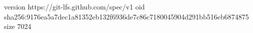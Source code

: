 version https://git-lfs.github.com/spec/v1
oid sha256:9176ea5a7dec1a81352eb132f6936de7c86c7180045904d291bb516eb6874875
size 7024
